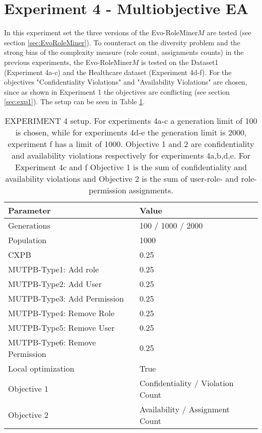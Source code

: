 \section{Experiment 4 - Multiobjective EA}
\label{sec:exp4}
In this experiment set the three versions of the Evo-RoleMiner$M$ are tested (see section \ref{sec:EvoRoleMiner}). To counteract on the diversity problem and the strong bias of the complexity measure (role count, assignments counts) in the previous experiments, the Evo-RoleMiner$M$ is tested on the Dataset1 (Experiment 4a-c) and the Healthcare dataset (Experiment 4d-f). For the objectives "Confidentiality Violations" and "Availability Violations" are chosen, since as shown in Experiment 1 the objectives are conflicting (see section \ref{sec:exp1}). The setup can be seen in Table \ref{tab:exp4_setup}.

\begin{table}[H]
	\centering
	\begin{adjustbox}{width=0.75\textwidth}
		\begin{tabular}{|l|l|}
			\hline
			\rowcolor{myGray} 
			\textbf{Parameter}              & \textbf{Value}    \\ \hline
			Generations                     & 100 / 1000 / 2000 \\ \hline
			Population                      & 1000        		\\ \hline
			CXPB                            & 0.25              \\ \hline
			MUTPB-Type1: Add role           & 0.25              \\ \hline
			MUTPB-Type2: Add User           & 0.25              \\ \hline
			MUTPB-Type3: Add Permission     & 0.25              \\ \hline
			MUTPB-Type4: Remove Role        & 0.25              \\ \hline
			MUTPB-Type5: Remove User        & 0.25              \\ \hline
			MUTPB-Type6: Remove Permission  & 0.25              \\ \hline
			Local optimization              & True        		\\ \hline
			Objective 1					    & Confidentiality / Violation Count   \\ \hline
			Objective 2					    & Availability / Assignment Count    	\\ \hline
		\end{tabular}
	\end{adjustbox}
	\caption{EXPERIMENT 4 setup. For experiments 4a-c a generation limit of 100 is chosen, while for experiments 4d-e the generation limit is 2000, experiment f has a limit of 1000. Objective 1 and 2 are confidentiality and availability violations respectively for experiments 4a,b,d,e. For Experiment 4c and f Objective 1 is the sum of confidentiality and availability violations and Objective 2 is the sum of user-role- and role-permission assignments.}
	\label{tab:exp4_setup}
\end{table}

